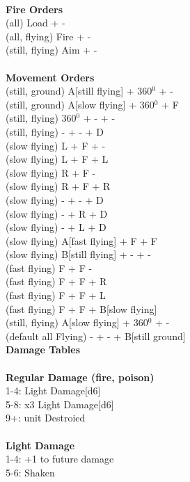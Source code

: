 \ \\ {\bf Fire Orders } \\
(all) Load + - \\
(all, flying) Fire + - \\
(still, flying) Aim + - \\
\ \\ {\bf Movement Orders } \\
(still, ground) A[still flying] + 360$^0$ + -  \\
(still, ground) A[slow flying] + 360$^0$ + F  \\
(still, flying) 360$^0$ + - + -   \\
(still, flying) - + - + D \\
(slow flying)  L + F + -  \\
(slow flying)  L + F + L  \\
(slow flying)  R + F -  \\
(slow flying)  R + F + R  \\
(slow flying)  - + - + D  \\
(slow flying)  - + R + D  \\
(slow flying)  - + L + D  \\
(slow flying)  A[fast flying] + F + F  \\
(slow flying)  B[still flying] + - + -  \\
(fast flying)  F + F -  \\
(fast flying)  F + F + R  \\
(fast flying)  F + F + L  \\
(fast flying)  F + F + B[slow flying]  \\
(still, flying) A[slow flying] + 360$^0$ + -  \\
(default all Flying) - + - + B[still ground] \\



{\bf Damage Tables} \\
\ \\ {\bf Regular Damage (fire, poison) } \\
1-4: Light Damage[d6] \\
5-8: x3 Light Damage[d6] \\
9+: unit Destroied \\
\ \\ {\bf Light Damage } \\
1-4: +1 to future damage \\
5-6: Shaken \\









